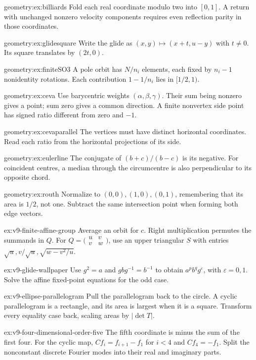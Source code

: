 \begin{hint}{geometry:ex:billiards}
Fold each real coordinate modulo two into $[0,1]$. A return with unchanged nonzero velocity components requires even reflection parity in those coordinates.
\end{hint}
\begin{hint}{geometry:ex:glidesquare}
Write the glide as $(x,y)\mapsto(x+t,u-y)$ with $t\ne0$. Its square translates by $(2t,0)$.
\end{hint}
\begin{hint}{geometry:ex:finiteSO3}
A pole orbit has $N/n_i$ elements, each fixed by $n_i-1$ nonidentity rotations. Each contribution $1-1/n_i$ lies in $[1/2,1)$.
\end{hint}
\begin{hint}{geometry:ex:ceva}
Use barycentric weights $(\alpha,\beta,\gamma)$. Their sum being nonzero gives a point; sum zero gives a common direction. A finite nonvertex side point has signed ratio different from zero and $-1$.
\end{hint}
\begin{hint}{geometry:ex:cevaparallel}
The vertices must have distinct horizontal coordinates. Read each ratio from the horizontal projections of its side.
\end{hint}
\begin{hint}{geometry:ex:eulerline}
The conjugate of $(b+c)/(b-c)$ is its negative. For coincident centres, a median through the circumcentre is also perpendicular to its opposite chord.
\end{hint}
\begin{hint}{geometry:ex:routh}
Normalize to $(0,0),(1,0),(0,1)$, remembering that its area is $1/2$, not one. Subtract the same intersection point when forming both edge vectors.
\end{hint}
\begin{hint}{ex:v9-finite-affine-group}
Average an orbit for $c$. Right multiplication permutes the summands in $Q$. For $Q=\bigl(\begin{smallmatrix}u&v\\v&w\end{smallmatrix}\bigr)$, use an upper triangular $S$ with entries $\sqrt u,v/\sqrt u,\sqrt{w-v^2/u}$.
\end{hint}
\begin{hint}{ex:v9-glide-wallpaper}
Use $g^2=a$ and $gbg^{-1}=b^{-1}$ to obtain $a^pb^qg^\varepsilon$, with $\varepsilon=0,1$. Solve the affine fixed-point equations for the odd case.
\end{hint}
\begin{hint}{ex:v9-ellipse-parallelogram}
Pull the parallelogram back to the circle. A cyclic parallelogram is a rectangle, and its area is largest when it is a square. Transform every equality case back, scaling areas by $|\det T|$.
\end{hint}
\begin{hint}{ex:v9-four-dimensional-order-five}
The fifth coordinate is minus the sum of the first four. For the cyclic map, $Cf_i=f_{i+1}-f_1$ for $i<4$ and $Cf_4=-f_1$. Split the nonconstant discrete Fourier modes into their real and imaginary parts.
\end{hint}

